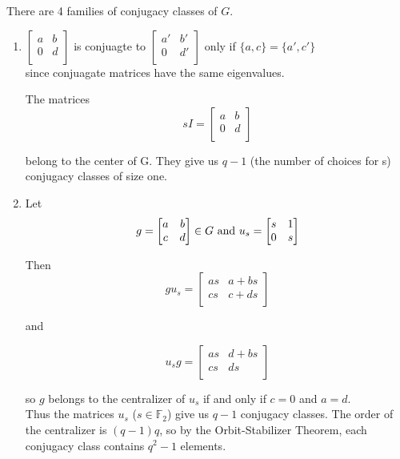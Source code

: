 \documentclass[12pt,twoside]{reedthesis}
\theoremstyle{definition}\newtheorem{definition}{Definition}
\theoremstyle{definition}\newtheorem{example}{Example}
\begin{document}
There are 4 families of conjugacy classes of $G$.
\begin{enumerate}

\item 
$ \begin{bmatrix}
a&b\\
0&d\\
\end{bmatrix}
$
is conjuagte to
$ \begin{bmatrix}
a'&b'\\
0&d'\\
\end{bmatrix}
$
only if $\{a,c\} = \{a',c'\}$ \\
since conjuagate matrices have the same eigenvalues.


The matrices 
\[sI = \begin{bmatrix}
a&b\\
0&d\\
\end{bmatrix}
\]

belong to the center of G.  They give us $q-1$ (the number of choices for s) conjugacy classes of size one.


\item 
Let
\[ g= \begin{bmatrix}
a&b\\
c&d\\
\end{bmatrix}
\in{G}   \textnormal{ and  }    u_s =
\begin{bmatrix}
s&1\\
0&s\\
\end{bmatrix}
\]

Then
\[
gu_s =
\begin{bmatrix}
as&a+bs\\
cs&c+ds\\
\end{bmatrix}
\]

and

\[
u_sg =
\begin{bmatrix}
as&d+bs\\
cs&ds\\
\end{bmatrix}
\]

so $g$ belongs to the centralizer of $u_s$ if and only if $c=0$ and $a=d$.\\
Thus the matrices $u_s$ ($s\in{\mathbb{F}_2}$) give us $q-1$ conjugacy classes.  The order of the centralizer is $(q-1)q$, so by the Orbit-Stabilizer Theorem, each conjugacy class contains $q^2-1$ elements.


\end{enumerate}
\end{document}
